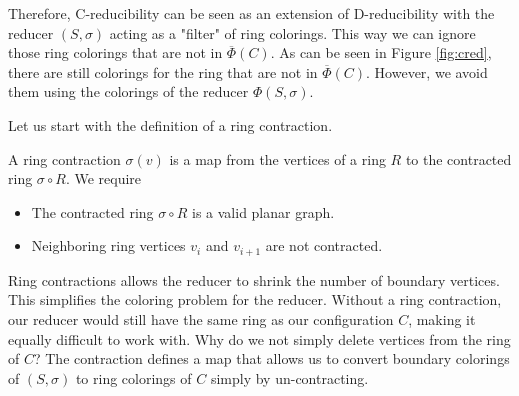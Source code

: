 Therefore, C-reducibility can be seen as an extension of D-reducibility with the reducer $(S, \sigma)$ acting as a "filter" of ring colorings. This way we can ignore those ring colorings that are not in $\overline{\Phi}(C)$. As can be seen in Figure \ref{fig:cred}, there are still colorings for the ring that are not in $\overline{\Phi}(C)$. However, we avoid them using the colorings of the reducer $\Phi(S, \sigma)$.

Let us start with the definition of a ring contraction.

\begin{definition}
    A ring contraction $\sigma(v)$ is a map from the vertices of a ring $R$ to the contracted ring $\sigma \circ R$. We require
    
    \begin{itemize}
        \item The contracted ring $\sigma \circ R$ is a valid planar graph.
        \item Neighboring ring vertices $v_i$ and $v_{i+1}$ are not contracted.
    \end{itemize}
\end{definition}

Ring contractions allows the reducer to shrink the number of boundary vertices. This simplifies the coloring problem for the reducer. Without a ring contraction, our reducer would still have the same ring as our configuration $C$, making it equally difficult to work with. Why do we not simply delete vertices from the ring of $C$? The contraction defines a map that allows us to convert boundary colorings of $(S,\sigma)$ to ring colorings of $C$ simply by un-contracting. 

